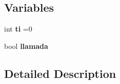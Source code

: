 \subsection*{Variables}
\begin{DoxyCompactItemize}
\item 
int {\bfseries ti} =0\hypertarget{group___events__module_gab15c864bf1bd92d2931e58603cfa7898}{}\label{group___events__module_gab15c864bf1bd92d2931e58603cfa7898}

\item 
bool {\bfseries llamada}\hypertarget{group___events__module_ga6e5d59dc997d8183a48546f5507b59e6}{}\label{group___events__module_ga6e5d59dc997d8183a48546f5507b59e6}

\end{DoxyCompactItemize}


\subsection{Detailed Description}
